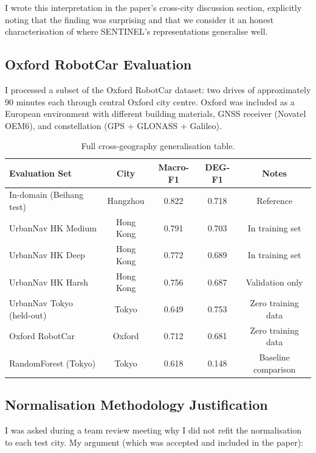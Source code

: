 \documentclass[12pt,a4paper]{article}
\begin{document}
I wrote this interpretation in the paper's cross-city discussion section, explicitly
noting that the finding was surprising and that we consider it an honest characterisation
of where SENTINEL's representations generalise well.

\subsection{Oxford RobotCar Evaluation}

I processed a subset of the Oxford RobotCar dataset: two drives of approximately 90
minutes each through central Oxford city centre.
Oxford was included as a European environment with different building materials,
GNSS receiver (Novatel OEM6), and constellation (GPS + GLONASS + Galileo).

\begin{table}[H]
  \centering
  \caption{Full cross-geography generalisation table.}
  \begin{tabular}{lcccc}
    \toprule
    \textbf{Evaluation Set} & \textbf{City} & \textbf{Macro-F1} &
    \textbf{DEG-F1} & \textbf{Notes} \\
    \midrule
    In-domain (Beihang test)    & Hangzhou    & 0.822 & 0.718 & Reference \\
    UrbanNav HK Medium         & Hong Kong   & 0.791 & 0.703 & In training set \\
    UrbanNav HK Deep           & Hong Kong   & 0.772 & 0.689 & In training set \\
    UrbanNav HK Harsh          & Hong Kong   & 0.756 & 0.687 & Validation only \\
    UrbanNav Tokyo (held-out)  & Tokyo       & 0.649 & 0.753 & Zero training data \\
    Oxford RobotCar            & Oxford      & 0.712 & 0.681 & Zero training data \\
    \midrule
    RandomForest (Tokyo)        & Tokyo       & 0.618 & 0.148 & Baseline comparison \\
    \bottomrule
  \end{tabular}
\end{table}

\subsection{Normalisation Methodology Justification}

I was asked during a team review meeting why I did not refit the normalisation to each
test city.
My argument (which was accepted and included in the paper):
\end{document}
